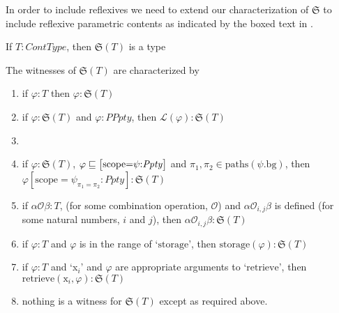 In order to include reflexives we need to extend our characterization
of $\mathfrak{S}$ to include reflexive parametric contents as
indicated by the boxed text in \nexteg{}.

\begin{ex} 
\begin{subex} 
 
\item If $T:\textit{ContType}$, then $\mathfrak{S}(T)$ is a type 
 
\item The witnesses of $\mathfrak{S}(T)$ are characterized by
  \begin{enumerate} 
 
  \item if $\varphi:T$ then $\varphi:\mathfrak{S}(T)$
    
  \item if $\varphi:\mathfrak{S}(T)$ and $\varphi:\textit{PPpty}$,
    then $\mathcal{L}(\varphi):\mathfrak{S}(T)$
    
  \item {}
    
  \item \begin{minipage}[t]{.9\linewidth}if $\varphi:\mathfrak{S}(T)$,
    $\varphi\sqsubseteq\text{\smallrecord{
        \smallmfield{scope}{$\psi$}{\textit{Ppty}}}}$ and
    $\pi_1,\pi_2\in\mathrm{paths}(\psi.\text{bg})$, then $\varphi[\text{scope}=\psi_{\pi_1=\pi_2}:\textit{Ppty}]:\mathfrak{S}(T)$\end{minipage}

    
  \item if $\alpha\mathcal{O}\beta:T$, (for
      some combination operation, $\mathcal{O}$) and
      $\alpha\mathcal{O}_{i,j}\beta$ is defined (for some natural
      numbers, $i$ and $j$), then $\alpha\mathcal{O}_{i,j}\beta:\mathfrak{S}(T)$
 
  \item if $\varphi:T$ and $\varphi$ is in the range of `$\mathrm{storage}$', then
    $\mathrm{storage}(\varphi):\mathfrak{S}(T)$

  \item if $\varphi:T$ and `x$_i$' and $\varphi$ are appropriate
    arguments to `$\mathrm{retrieve}$', then
    $\mathrm{retrieve}(\text{x}_i,\varphi):\mathfrak{S}(T)$
    
  \item nothing is a witness for $\mathfrak{S}(T)$ except as required above.
 
  \end{enumerate} 
  
 
\end{subex} 
\label{ex:storage-reflexive}   
\end{ex}

